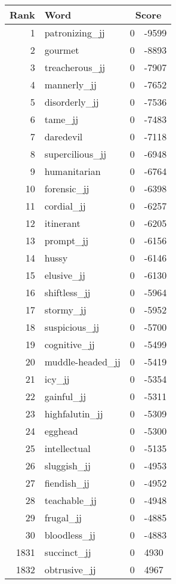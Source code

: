 \begin{longtable}[!htbp]{| rlr@{.}l |}
    \hline
    \textbf{Rank} & \textbf{Word} & \multicolumn{2}{c|}{\textbf{Score}} \\
    \hline
    \endhead
    1 & patronizing\_jj & 0 & -9599 \\
    2 & gourmet & 0 & -8893 \\
    3 & treacherous\_jj & 0 & -7907 \\
    4 & mannerly\_jj & 0 & -7652 \\
    5 & disorderly\_jj & 0 & -7536 \\
    6 & tame\_jj & 0 & -7483 \\
    7 & daredevil & 0 & -7118 \\
    8 & supercilious\_jj & 0 & -6948 \\
    9 & humanitarian & 0 & -6764 \\
    10 & forensic\_jj & 0 & -6398 \\
    11 & cordial\_jj & 0 & -6257 \\
    12 & itinerant & 0 & -6205 \\
    13 & prompt\_jj & 0 & -6156 \\
    14 & hussy & 0 & -6146 \\
    15 & elusive\_jj & 0 & -6130 \\
    16 & shiftless\_jj & 0 & -5964 \\
    17 & stormy\_jj & 0 & -5952 \\
    18 & suspicious\_jj & 0 & -5700 \\
    19 & cognitive\_jj & 0 & -5499 \\
    20 & muddle-headed\_jj & 0 & -5419 \\
    21 & icy\_jj & 0 & -5354 \\
    22 & gainful\_jj & 0 & -5311 \\
    23 & highfalutin\_jj & 0 & -5309 \\
    24 & egghead & 0 & -5300 \\
    25 & intellectual & 0 & -5135 \\
    26 & sluggish\_jj & 0 & -4953 \\
    27 & fiendish\_jj & 0 & -4952 \\
    28 & teachable\_jj & 0 & -4948 \\
    29 & frugal\_jj & 0 & -4885 \\
    30 & bloodless\_jj & 0 & -4883 \\
    1831 & succinct\_jj & 0 & 4930 \\
    1832 & obtrusive\_jj & 0 & 4967 \\

\end{longtable}

